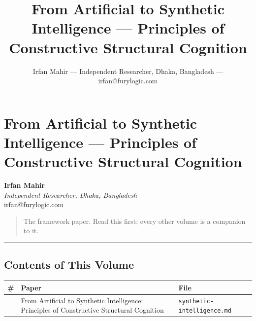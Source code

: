 \documentclass[
  11pt,
  a4paper,
]{article}
\title{From Artificial to Synthetic Intelligence --- Principles of
Constructive Structural Cognition}
\author{Irfan Mahir --- Independent Researcher, Dhaka, Bangladesh ---
irfan@furylogic.com}
\date{}
\begin{document}
\maketitle

{
\hypersetup{linkcolor=}
\setcounter{tocdepth}{2}
\tableofcontents
}
\section{From Artificial to Synthetic Intelligence --- Principles of
Constructive Structural
Cognition}\label{from-artificial-to-synthetic-intelligence-principles-of-constructive-structural-cognition}

\textbf{Irfan Mahir}\\
\emph{Independent Researcher, Dhaka, Bangladesh}\\
irfan@furylogic.com

\begin{quote}
The framework paper. Read this first; every other volume is a companion
to it.
\end{quote}

\begin{center}\rule{0.5\linewidth}{0.5pt}\end{center}

\subsection{Contents of This Volume}\label{contents-of-this-volume}

\begin{longtable}[]{@{}
  >{\raggedright\arraybackslash}p{}
  >{\raggedright\arraybackslash}p{}
  >{\raggedright\arraybackslash}p{}@{}}
\toprule\noalign{}
\begin{minipage}[b]{\linewidth}\raggedright
\#
\end{minipage} & \begin{minipage}[b]{\linewidth}\raggedright
Paper
\end{minipage} & \begin{minipage}[b]{\linewidth}\raggedright
File
\end{minipage} \\
\midrule\noalign{}
\endhead
\bottomrule\noalign{}
\endlastfoot
1 & From Artificial to Synthetic Intelligence: Principles of
Constructive Structural Cognition &
\texttt{synthetic-intelligence.md} \\
\end{longtable}
\end{document}
